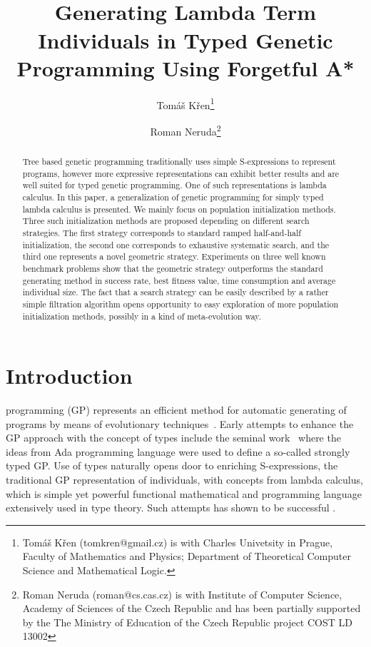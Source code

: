 \documentclass[conference]{IEEEtran}
\begin{document}
\title{\ \\ \LARGE\bf 
Generating Lambda Term Individuals in Typed Genetic Programming Using Forgetful A*}

\author{Tom\'{a}\v{s} K\v{r}en\thanks{Tomáš Křen (tomkren@gmail.cz) is with Charles Univetsity in Prague, Faculty of Mathematics and Physics; Department of Theoretical Computer Science and Mathematical Logic.} \and Roman Neruda\thanks{Roman Neruda (roman@cs.cas.cz) is with Institute of Computer Science, Academy of Sciences of the Czech Republic and has been partially supported by the The Ministry of Education of the Czech Republic project COST LD 13002}}

\maketitle

\begin{abstract}
Tree based genetic programming traditionally uses simple S-expressions to represent programs, however more expressive representations can exhibit better results and are well suited for typed genetic programming. One of such representations is lambda calculus.
In this paper, a generalization of genetic programming 
for simply typed lambda calculus is presented. We mainly focus on
population initialization methods. 
Three such initialization methods are proposed 
depending on different search strategies. 
The first strategy corresponds to standard ramped half-and-half initialization, 
the second one corresponds to exhaustive systematic search, and the third one 
represents a novel geometric strategy.
Experiments on three well known benchmark problems show
that the geometric strategy outperforms
the standard generating method in success rate, best fitness value,
time consumption and average individual size.
The fact that a search strategy can be easily described by a rather simple filtration algorithm opens opportunity to easy exploration of more 
population initialization methods, possibly in a kind of meta-evolution way.
\end{abstract}

\section{Introduction}
 programming (GP) represents an efficient method for automatic generating of programs by means of evolutionary techniques~\cite{koza92,koza03}. Early attempts to enhance the GP approach with the concept of types include the seminal work~\cite{montana95} where the ideas from Ada programming language were used to define a so-called strongly typed GP.   
Use of types naturally opens door to enriching S-expressions,
the traditional GP representation of individuals, with concepts from
lambda calculus, which is simple yet powerful functional mathematical and programming 
language extensively used in type theory. Such attempts has shown to be 
successful \cite{yu01}. 
\end{document}
